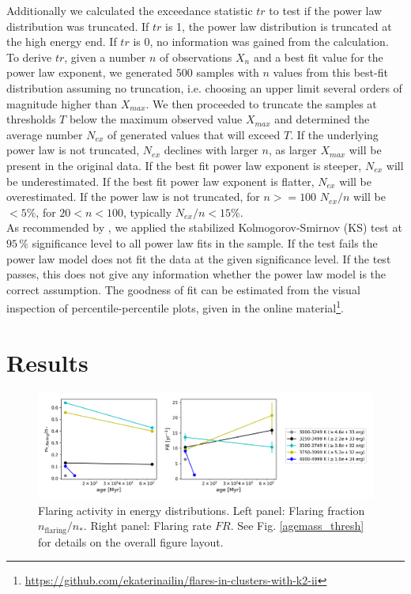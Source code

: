 \documentclass{aa}
\begin{document}
 Additionally we calculated the exceedance statistic $tr$ to test if the power law distribution was truncated. If $tr$ is 1, the power law distribution is truncated at the high energy end. If $tr$ is 0, no information was gained from the calculation. To derive $tr$, given a number $n$ of observations $X_{n}$ and a best fit value for the power law exponent, we generated 500 samples with $n$ values from this best-fit distribution assuming no truncation, i.e. choosing an upper limit several orders of magnitude higher than $X_{max}$. We then proceeded to truncate the samples at thresholds $T$ below the maximum observed value $X_{max}$ and determined the average number $N_{ex}$ of generated values that will exceed $T$. If the underlying power law is not truncated, $N_{ex}$ declines with larger $n$, as larger $X_{max}$ will be present in the original data. If the best fit power law exponent is steeper, $N_{ex}$ will be underestimated. If the best fit power law exponent is flatter, $N_{ex}$ will be overestimated. If the power law is not truncated, for $n>=100$ $N_{ex}/n$ will be $< 5\%$, for $20<n<100$, typically $N_{ex}/n < 15\%$.
\\
As recommended by \citet{maschberger_powerlaw_2009}, we applied the stabilized Kolmogorov-Smirnov (KS) test at $95\,\%$ significance level to all power law fits in the sample. If the test fails the power law model does not fit the data at the given significance level. If the test passes, this does not give any information whether the power law model is the correct assumption. The goodness of fit can be estimated from the visual inspection of percentile-percentile plots, given in the online material\footnote{\url{https://github.com/ekaterinailin/flares-in-clusters-with-k2-ii}}.


\section{Results}
    \begin{figure}
            \includegraphics[width=\hsize]{pics/Teffbin_age_mass_AM/FR_flarefrac_energy_2019_03_22_15.png}
       \caption{Flaring activity in energy distributions. Left panel: Flaring fraction $n_\mathrm{flaring}/n_*$. Right panel: Flaring rate $FR$. See Fig. \ref{agemass_thresh} for details on the overall figure layout.}
       \label{agemass_FR_flarefrac_erg}
   \end{figure}
\end{document}
